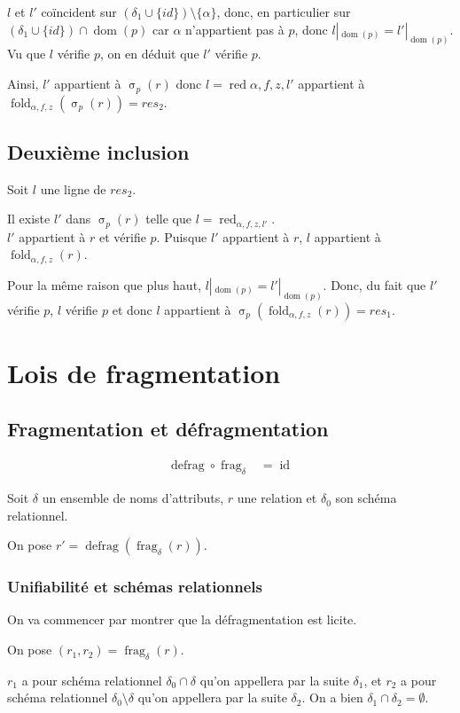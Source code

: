 \documentclass[french]{article}
\DeclareMathOperator{\sel}{\sigma}
\DeclareMathOperator{\frag}{frag}
\DeclareMathOperator{\defrag}{defrag}
\DeclareMathOperator{\id}{id}
\DeclareMathOperator{\dom}{dom}
\DeclareMathOperator{\redu}{red}
\newcommand{\selP}{\sel_p}
\newcommand{\fragDelta}{\frag_{\delta}}
\newcommand{\cip}{\cup \{id\}}
\newcommand{\fold}[3]{\operatorname{fold}_{#1, #2, #3}}
\newcommand{\foldAlphafz}{\fold{\alpha}{f}{z}}
\begin{document}
$l$ et $l'$ coïncident sur $(\delta_1 \cip) \setminus \{ \alpha \}$,
donc, en particulier sur $(\delta_1 \cip) \cap \dom(p)$ car
$\alpha$ n'appartient pas à $p$, donc $l|_{\dom(p)} = l'|_{\dom(p)}$.
Vu que $l$ vérifie $p$, on en déduit que $l'$ vérifie $p$.

Ainsi, $l'$ appartient à $\selP(r)$ donc
$l = \redu{\alpha, f, z, l'}$ appartient
à $\foldAlphafz(\selP(r)) = res_2$.

\subsection*{Deuxième inclusion}
Soit $l$ une ligne de $res_2$.

Il existe $l'$ dans $\selP(r)$ telle que
$l = \redu_{\alpha, f, z, l'}$. \\

$l'$ appartient à $r$ et vérifie $p$.
Puisque $l'$ appartient à $r$,
$l$ appartient à $\foldAlphafz(r)$.

Pour la même raison que plus haut, $l|_{\dom(p)} = l'|_{\dom(p)}$.
Donc, du fait que $l'$ vérifie $p$, $l$ vérifie $p$ et donc
$l$ appartient à $\selP(\foldAlphafz(r)) = res_1$.

\section*{Lois de fragmentation}
\subsection*{Fragmentation et défragmentation}
\begin{align}
\defrag \circ \fragDelta
& = \id
\end{align}

Soit $\delta$ un ensemble de noms d'attributs,
$r$ une relation et $\delta_0$ son schéma relationnel.

On pose $r' = \defrag(\fragDelta(r))$.

\subsubsection*{Unifiabilité et schémas relationnels}
On va commencer par montrer que la défragmentation est licite.

On pose 
$(r_1, r_2) = \fragDelta(r)$.

$r_1$ a pour schéma relationnel
$\delta_0 \cap \delta$ qu'on appellera par la suite $\delta_1$,
et $r_2$ a pour schéma relationnel
$\delta_0\setminus \delta $ qu'on appellera par la suite
$\delta_2$.
On a bien $\delta_1 \cap \delta_2 = \emptyset$. 
\end{document}
